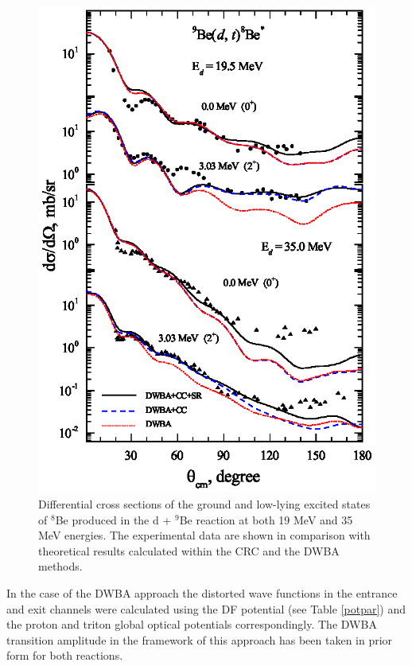 \documentclass[10pt]{iopart}
\begin{document}
\begin{figure}[tp]
\includegraphics[scale=0.8]{3H8BE.eps}
\caption{
\label{3H8BE}
Differential cross sections of the ground and low-lying excited states of $^{8}$Be produced in the d + $^9$Be reaction at both 19 MeV and 35 MeV energies. The experimental data are shown in comparison with  theoretical results calculated within the CRC and the DWBA methods.}
\end{figure}

In the case of the DWBA approach the distorted wave functions in the entrance and exit channels were calculated using the DF potential (see Table \ref{potpar}) and the proton \cite{globalProton} and triton \cite{globalTriton} global optical potentials correspondingly. The DWBA transition amplitude in the framework of this approach has been taken in prior form for both reactions.
\end{document}

